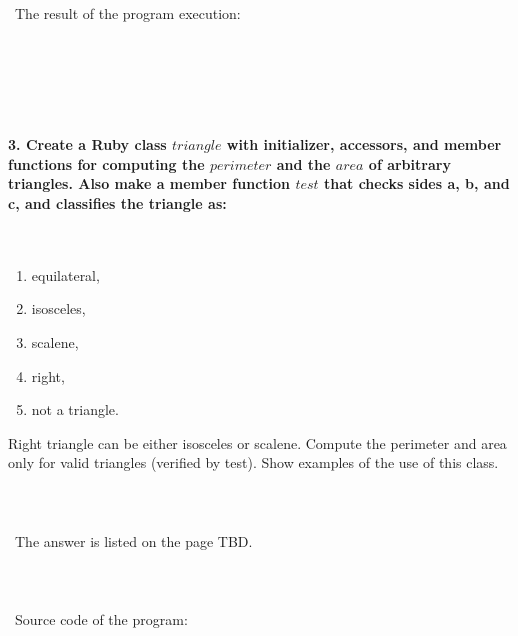 \documentclass{article}
\begin{document}
\paragraph{}\
	The result of the program execution:
	
\begin{verbatim} 

\end{verbatim}
	
\paragraph{}\
\paragraph{}\

\paragraph{3. Create a Ruby class \(triangle\) with initializer, accessors, and member functions for computing the \(perimeter\) and the \(area\) of arbitrary triangles. Also make a member function \(test\) that checks sides a, b, and c, and classifies the triangle as: }\

\begin{enumerate}[label=(\arabic*)]
	\item equilateral,
	\item isosceles,
	\item scalene,
	\item right,
	\item not a triangle.
\end{enumerate}

Right triangle can be either isosceles or scalene. Compute the perimeter and area only for valid triangles (verified by test). Show examples of the use of this class.

\paragraph{}\
\paragraph{}\
	The answer is listed on the page TBD.
\paragraph{}\
\paragraph{}\
Source code of the program:
\end{document}
